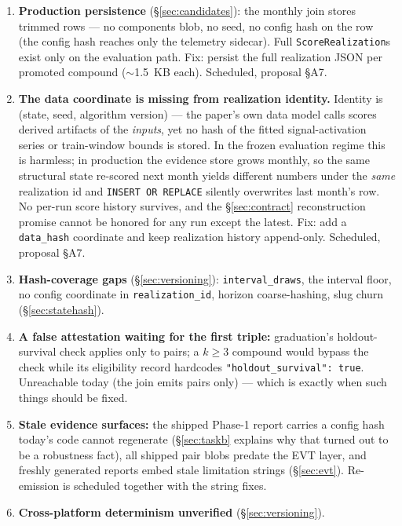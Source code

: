\documentclass[11pt]{article}
\begin{document}
\begin{enumerate}[leftmargin=1.6em]
\item \textbf{Production persistence} (\S\ref{sec:candidates}): the monthly
  join stores trimmed rows --- no components blob, no seed, no config hash
  on the row (the config hash reaches only the telemetry sidecar). Full
  \texttt{ScoreRealization}s exist only on the evaluation path. Fix: persist
  the full realization JSON per promoted compound ($\sim$1.5~KB each).
  Scheduled, proposal \S A7.
\item \textbf{The data coordinate is missing from realization identity.}
  Identity is (state, seed, algorithm version) --- the paper's own data
  model calls scores derived artifacts of the \emph{inputs}, yet no hash of
  the fitted signal-activation series or train-window bounds is stored. In
  the frozen evaluation regime this is harmless; in production the evidence
  store grows monthly, so the same structural state re-scored next month
  yields different numbers under the \emph{same} realization id and
  \texttt{INSERT OR REPLACE} silently overwrites last month's row. No
  per-run score history survives, and the \S\ref{sec:contract}
  reconstruction promise cannot be honored for any run except the latest.
  Fix: add a \texttt{data\_hash} coordinate and keep realization history
  append-only. Scheduled, proposal \S A7.
\item \textbf{Hash-coverage gaps} (\S\ref{sec:versioning}):
  \texttt{interval\_draws}, the interval floor, no config coordinate in
  \texttt{realization\_id}, horizon coarse-hashing, slug churn
  (\S\ref{sec:statehash}).
\item \textbf{A false attestation waiting for the first triple:}
  graduation's holdout-survival check applies only to pairs; a $k \ge 3$
  compound would bypass the check while its eligibility record hardcodes
  \texttt{"holdout\_survival": true}. Unreachable today (the join emits
  pairs only) --- which is exactly when such things should be fixed.
\item \textbf{Stale evidence surfaces:} the shipped Phase-1 report carries a
  config hash today's code cannot regenerate (\S\ref{sec:taskb} explains why
  that turned out to be a robustness fact), all shipped pair blobs predate
  the EVT layer, and freshly generated reports embed stale limitation
  strings (\S\ref{sec:evt}). Re-emission is scheduled together with the
  string fixes.
\item \textbf{Cross-platform determinism unverified}
  (\S\ref{sec:versioning}).
\end{enumerate}
\end{document}
